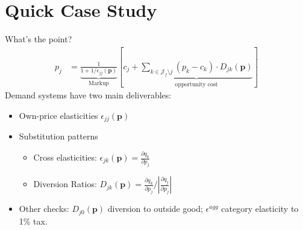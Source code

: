 \section*{Quick Case Study}



\begin{frame}{What's the point?}
\begin{align*}
p_j &= \underbrace{\frac{1}{1+1/\epsilon_{jj}(\mathbf{p})}}_{\text{Markup}} \left[c_j + \underbrace{\sum_{k \in \mathcal{J}_{f} \setminus j}  (p_k-c_k) \cdot  D_{jk} (\mathbf{p}) }_{\text{opportunity cost}}\right]
\end{align*}
Demand systems have two main deliverables:
\begin{itemize}
\item Own-price elasticities $\epsilon_{jj}(\mathbf{p})$
\item Substitution patterns
\begin{itemize}
\item Cross elasticities: $\epsilon_{jk}(\mathbf{p}) = \frac{\partial q_k}{\partial p_j}$
\item Diversion Ratios: $D_{jk}(\mathbf{p}) = \frac{\partial q_k}{\partial p_j}/|\frac{\partial q_j}{\partial p_j}|$
\end{itemize}
\item Other checks: $D_{j0}(\mathbf{p})$ diversion to outside good; $\epsilon^{agg}$ category elasticity to 1\% tax.
\end{itemize}
\end{frame}



